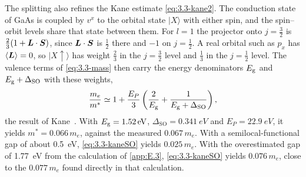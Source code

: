The splitting also refines the Kane estimate \cref{eq:3.3-kane2}. The conduction state of GaAs is coupled by $v^x$ to the orbital state $|X\rangle$ with either spin, and the spin--orbit levels share that state between them. For $l = 1$ the projector onto $j = \frac32$ is $\frac23(1 + \bm{L}\cdot\bm{S})$, since $\bm{L}\cdot\bm{S}$ is $\frac12$ there and $-1$ on $j = \frac12$. A real orbital such as $p_x$ has $\langle\bm{L}\rangle = 0$, so $|X\!\uparrow\rangle$ has weight $\frac23$ in the $j = \frac32$ level and $\frac13$ in the $j = \frac12$ level. The valence terms of \cref{eq:3.3-mass} then carry the energy denominators $E_{\mathrm{g}}$ and $E_{\mathrm{g}} + \Delta_{\mathrm{SO}}$ with these weights,
\begin{equation}
  \frac{m_e}{m^*} \simeq 1 + \frac{E_P}{3}\left(\frac{2}{E_{\mathrm{g}}} + \frac{1}{E_{\mathrm{g}} + \Delta_{\mathrm{SO}}}\right),
  \label{eq:3.3-kaneSO}
\end{equation}
the result of Kane~\cite{kane1957band}. With $E_{\mathrm{g}} = \SI{1.52}{eV}$, $\Delta_{\mathrm{SO}} = \SI{0.341}{eV}$ and $E_P = \SI{22.9}{eV}$, it yields $m^* = 0.066\,m_e$, against the measured $0.067\,m_e$. With a semilocal-functional gap of about \SI{0.5}{eV}, \cref{eq:3.3-kaneSO} yields $0.025\,m_e$. With the overestimated gap of \SI{1.77}{eV} from the calculation of \cref{app:E.3}, \cref{eq:3.3-kaneSO} yields $0.076\,m_e$, close to the $0.077\,m_e$ found directly in that calculation.

